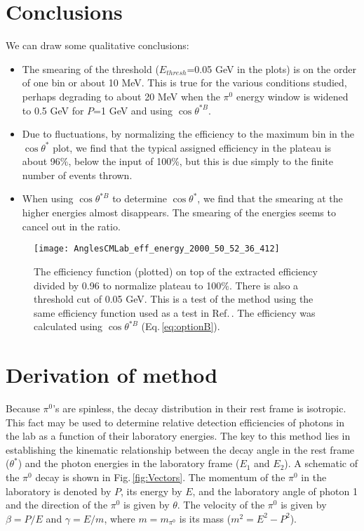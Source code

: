 \documentclass[12pt]{article}
\begin{document}
\section{Conclusions}
 We can draw some qualitative conclusions:
 \begin{itemize}
 \item The smearing of the threshold ($E_{thresh}$=0.05 GeV in the plots) is on the order of one bin or about 10 MeV. This is true for the various conditions studied, perhaps degrading to about 20 MeV when the
 $\pi^0$ energy window is widened to 0.5 GeV for $P$=1 GeV and using $\cos{\theta^{*B}}$. 
 \item Due to fluctuations, by normalizing the efficiency to the maximum bin in the $\cos{\theta^*}$ plot, we find that the typical assigned efficiency in the plateau is about 96\%, 
 below the input of 100\%, but this is due simply to the finite number of events thrown.
 \item When using $\cos{\theta^{*B}}$ to determine $\cos{\theta^*}$, we find that the smearing at the higher energies almost disappears. The smearing of the energies seems to cancel out  in the ratio.
 \end{itemize}  
   
\begin{figure}[tbph]
\begin{center}
\texttt{[image: AnglesCMLab\_eff\_energy\_2000\_50\_52\_36\_412]}
\caption{The efficiency function (plotted) on top of the extracted efficiency divided by 0.96 to normalize plateau to 100\%.  There is also a threshold cut of 0.05 GeV.
This is a test of the method using the same efficiency function used as a test in Ref.\,\cite{hdnote3844}.
The efficiency was calculated using  $\cos{\theta^{*B}}$ (Eq.\,\ref{eq:optionB}). 
\label{fig:AnglesCMLab_eff_p4}}
\end{center}
\end{figure}     
   
 
                                                                              
    

\clearpage
\newpage
\appendix
\section{Derivation of method  \label{app:derivation}}
Because $\pi^0$'s are spinless, the decay distribution in their rest frame is isotropic. This fact may be used to determine relative detection efficiencies of photons in the lab as a function of their laboratory 
energies. The key to this method lies in establishing the kinematic relationship between the decay angle in the rest frame ($\theta^*$) and the photon energies in the laboratory frame ($E_1$ and $E_{2}$). 
A schematic of the $\pi^0$ decay is shown in Fig.\,\ref{fig:Vectors}. The momentum of the $\pi^0$ in the laboratory is denoted by $P$, its energy by $E$, and the laboratory angle of photon 1 and the 
direction of the $\pi^0$ is given by $\theta$. The velocity of the $\pi^0$ is given by $\beta = P/E$ and $\gamma = E/m$, where $m=m_{\pi^0}$ is its mass ($m^2 = E^2 - P^2$).
\end{document}
